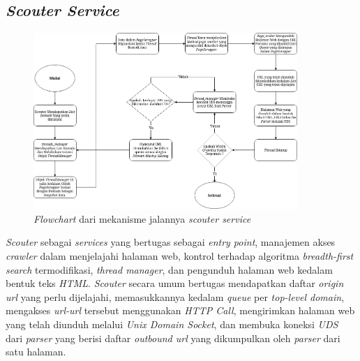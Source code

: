 \subsection{\emph{Scouter Service}}

\begin{figure}[H]
  \centering
  \includegraphics[keepaspectratio, width=10cm]{gambar/scouter-flowchart.png}
  \caption{\emph{Flowchart} dari mekanisme jalannya \emph{scouter service}}
  \label{gambar:scouter-flowchart}
\end{figure}

\emph{Scouter} sebagai \emph{services} yang bertugas sebagai \emph{entry point}, manajemen akses \emph{crawler} dalam menjelajahi halaman web, kontrol terhadap algoritma \emph{breadth-first search} termodifikasi, \emph{thread manager}, dan pengunduh halaman web kedalam bentuk teks \emph{HTML}. \emph{Scouter} secara umum bertugas mendapatkan daftar \emph{origin url} yang perlu dijelajahi, memasukkannya kedalam \emph{queue} per \emph{top-level domain}, mengakses \emph{url-url} tersebut menggunakan \emph{HTTP Call}, mengirimkan halaman web yang telah diunduh melalui \emph{Unix Domain Socket}, dan membuka koneksi \emph{UDS} dari \emph{parser} yang berisi daftar \emph{outbound url} yang dikumpulkan oleh \emph{parser} dari satu halaman.

